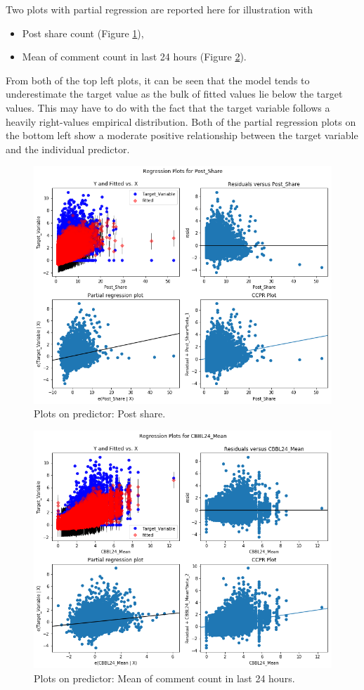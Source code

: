 \documentclass[]{article}
\begin{document}
Two plots with partial regression are reported here for illustration with 
\begin{itemize}
	\item Post share count (Figure \ref{fig:prp_simple_1}), 
	\item Mean of comment count in last 24 hours (Figure \ref{fig:prp_simple_2}).
\end{itemize}
From both of the top left plots, it can be seen that the model tends to underestimate the target value as the bulk of fitted values lie below the target values. This may have to do with the fact that the target variable follows a heavily right-values empirical distribution. Both of the partial regression plots on the bottom left show a moderate positive relationship between the target variable and the individual predictor.  
%
\begin{figure}[hbtp]
	\centering
	\includegraphics[width=1\columnwidth]{../Figures/prp_simple_1}
	\caption{Plots on predictor: Post share.}
	\label{fig:prp_simple_1}
\end{figure}
%
%
\begin{figure}[hbtp]
	\centering
	\includegraphics[width=1\columnwidth]{../Figures/prp_simple_2}
	\caption{Plots on predictor: Mean of comment count in last 24 hours.}
	\label{fig:prp_simple_2}
\end{figure}
\end{document}
